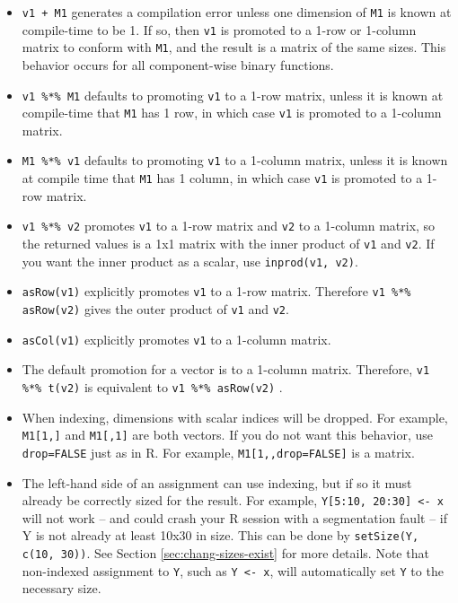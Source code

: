 \documentclass[12pt,oneside]{book}\usepackage[]{graphicx}\usepackage[]{color}
\def\cd#1{\texttt{#1}}
\begin{document}
\begin{itemize}
\item  \cd{v1 + M1} generates a compilation error unless one dimension of
\cd{M1} is known at compile-time to be 1.  If so, then \cd{v1} is promoted to a
1-row or 1-column matrix to conform with \cd{M1}, and the result is a
matrix of the same sizes.  This behavior occurs for
all component-wise binary functions.

\item \cd{v1 \%*\% M1} defaults to promoting \cd{v1} to a 1-row matrix,
  unless it is known at compile-time that \cd{M1} has 1 row, in which case
  \cd{v1} is promoted to a 1-column matrix.

\item \cd{M1 \%*\% v1} defaults to promoting \cd{v1} to a 1-column matrix,
unless it is known at compile time that \cd{M1} has 1 column, in which case
\cd{v1} is promoted to a 1-row matrix.

\item \cd{v1 \%*\% v2} promotes \cd{v1} to a 1-row matrix and \cd{v2} to a
1-column matrix, so the returned values is a 1x1 matrix with the inner
product of \cd{v1} and \cd{v2}.  If you want the inner product as a scalar, use
\cd{inprod(v1, v2)}. 

\item \cd{asRow(v1)} explicitly promotes \cd{v1} to a 1-row matrix.
  Therefore \cd{v1 \%*\% asRow(v2)} gives the outer product of
  \cd{v1} and \cd{v2}.
  
\item \cd{asCol(v1)} explicitly promotes \cd{v1} to a 1-column matrix.  
  
\item The default promotion for a vector is to a 1-column matrix.
  Therefore, \cd{v1 \%*\% t(v2)} is equivalent to \cd{v1 \%*\% asRow(v2)} .

\item When indexing, dimensions with scalar indices will be dropped.
  For example, \cd{M1[1,]} and \cd{M1[,1]} are both vectors.  If you
  do not want this behavior, use \cd{drop=FALSE} just as in R.  For
  example, \cd{M1[1,,drop=FALSE]} is a matrix.
  
\item The left-hand side of an assignment can use indexing, but if so
  it must already be correctly sized for the result.  For example,
  \cd{Y[5:10, 20:30] <- x} will not work -- and could crash
  your R session with a segmentation fault --  if Y is not
  already at least 10x30 in size.  This can be done by \cd{setSize(Y,
    c(10, 30))}.  See Section \ref{sec:chang-sizes-exist} for more
  details.  Note that non-indexed assignment to \cd{Y}, such as \cd{Y
    <- x}, will automatically set \cd{Y} to the necessary size. 
  
\end{itemize}
\end{document}
